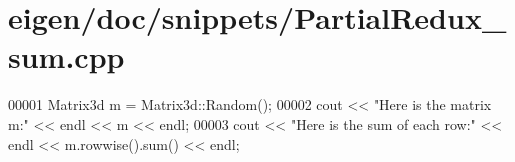 \hypertarget{eigen_2doc_2snippets_2_partial_redux__sum_8cpp_source}{}\section{eigen/doc/snippets/\+Partial\+Redux\+\_\+sum.cpp}
\label{eigen_2doc_2snippets_2_partial_redux__sum_8cpp_source}

\begin{DoxyCode}
00001 Matrix3d m = Matrix3d::Random();
00002 cout << \textcolor{stringliteral}{"Here is the matrix m:"} << endl << m << endl;
00003 cout << \textcolor{stringliteral}{"Here is the sum of each row:"} << endl << m.rowwise().sum() << endl;
\end{DoxyCode}
